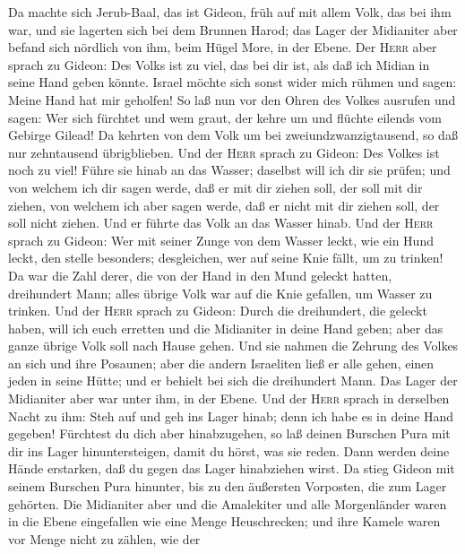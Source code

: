  Da machte sich Jerub-Baal, das ist Gideon, früh auf mit
allem Volk, das bei ihm war, und sie lagerten sich bei dem Brunnen
Harod; das Lager der Midianiter aber befand sich nördlich von ihm, beim
Hügel More, in der Ebene.  Der \textsc{Herr} aber sprach
zu Gideon: Des Volks ist zu viel, das bei dir ist, als daß ich Midian in
seine Hand geben könnte. Israel möchte sich sonst wider mich rühmen und
sagen: Meine Hand hat mir geholfen!  So laß nun vor den
Ohren des Volkes ausrufen und sagen: Wer sich fürchtet und wem graut,
der kehre um und flüchte eilends vom Gebirge Gilead! Da kehrten von dem
Volk um bei zweiundzwanzigtausend, so daß nur zehntausend übrigblieben.
 Und der \textsc{Herr} sprach zu Gideon: Des Volkes ist
noch zu viel! Führe sie hinab an das Wasser; daselbst will ich dir sie
prüfen; und von welchem ich dir sagen werde, daß er mit dir ziehen soll,
der soll mit dir ziehen, von welchem ich aber sagen werde, daß er nicht
mit dir ziehen soll, der soll nicht ziehen.  Und er führte
das Volk an das Wasser hinab. Und der \textsc{Herr} sprach zu Gideon:
Wer mit seiner Zunge von dem Wasser leckt, wie ein Hund leckt, den
stelle besonders; desgleichen, wer auf seine Knie fällt, um zu trinken!
 Da war die Zahl derer, die von der Hand in den Mund
geleckt hatten, dreihundert Mann; alles übrige Volk war auf die Knie
gefallen, um Wasser zu trinken.  Und der \textsc{Herr}
sprach zu Gideon: Durch die dreihundert, die geleckt haben, will ich
euch erretten und die Midianiter in deine Hand geben; aber das ganze
übrige Volk soll nach Hause gehen.  Und sie nahmen die
Zehrung des Volkes an sich und ihre Posaunen; aber die andern Israeliten
ließ er alle gehen, einen jeden in seine Hütte; und er behielt bei sich
die dreihundert Mann. Das Lager der Midianiter aber war unter ihm, in
der Ebene.  Und der \textsc{Herr} sprach in derselben
Nacht zu ihm: Steh auf und geh ins Lager hinab; denn ich habe es in
deine Hand gegeben!  Fürchtest du dich aber hinabzugehen,
so laß deinen Burschen Pura mit dir ins Lager hinuntersteigen,
 damit du hörst, was sie reden. Dann werden deine Hände
erstarken, daß du gegen das Lager hinabziehen wirst. Da stieg Gideon mit
seinem Burschen Pura hinunter, bis zu den äußersten Vorposten, die zum
Lager gehörten.  Die Midianiter aber und die Amalekiter
und alle Morgenländer waren in die Ebene eingefallen wie eine Menge
Heuschrecken; und ihre Kamele waren vor Menge nicht zu zählen, wie der
